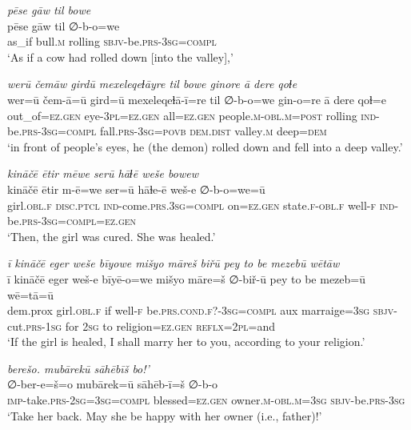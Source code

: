 \ea \label{ZP.79}
\textit{pēse gāw til bowe} \\ 
\gll pēse gāw til ∅-b-o=we \\ 
 as\_if bull\textsc{.m} rolling \textsc{sbjv-}be\textsc{.prs}\textsc{-3sg}\textsc{=compl} \\ 
\glt `As if a cow had rolled down [into the valley],'
\z 
 
\ea \label{ZP.80}
\textit{werū čemāw girdū mexeleqeɫāyre til bowe ginore ā dere qoɫe} \\ 
\gll wer=ū čem-ā=ū gird=ū mexeleqeɫā-ī=re til ∅-b-o=we gin-o=re ā dere qoɫ=e \\ 
 out\_of\textsc{\textsc{=ez.gen}} eye\textsc{-3pl}\textsc{\textsc{=ez.gen}} all\textsc{\textsc{=ez.gen}} people\textsc{.m}\textsc{-obl}\textsc{.m}\textsc{=\textsc{post}} rolling \textsc{ind-}be\textsc{.prs}\textsc{-3sg}\textsc{=compl} fall\textsc{.prs}\textsc{-3sg}\textsc{=\textsc{povb}} \textsc{dem.dist} valley\textsc{.m} deep\textsc{=dem} \\ 
\glt `in front of people’s eyes, he (the demon) rolled down and fell into a deep valley.'
\z 
 
\ea \label{ZP.82}
\textit{kināčē ētir mēwe serū hāɫē weše bowew} \\ 
\gll kināčē ētir m-ē=we ser=ū hāɫe-ē weš-e ∅-b-o=we=ū \\ 
 girl\textsc{.obl}\textsc{.f} \textsc{disc.ptcl} \textsc{ind-}come\textsc{.prs}\textsc{.3sg}\textsc{=compl} on\textsc{\textsc{=ez.gen}} state\textsc{.f}\textsc{-obl}\textsc{.f} well\textsc{-f} \textsc{ind-}be\textsc{.prs}\textsc{-3sg}\textsc{=compl}\textsc{\textsc{=ez.gen}} \\ 
\glt `Then, the girl was cured. She was healed.'
\z 
 
\ea \label{ZP.100}
\textit{ī kināčē eger weše bīyowe mišyo māreš biřū pey to be mezebū wētāw} \\ 
\gll ī kināčē eger weš-e bīyē-o=we mišyo māre=š ∅-biř-ū pey to be mezeb=ū wē=tā=ū \\ 
 dem.prox girl\textsc{.obl}\textsc{.f} if well\textsc{-f} be\textsc{.prs}.\textsc{cond}\textsc{.f}?\textsc{-3sg}\textsc{=compl} aux marraige\textsc{=3sg} \textsc{sbjv-}cut\textsc{.prs}\textsc{-\textsc{1sg}} for \textsc{2sg} to religion\textsc{\textsc{=ez.gen}} \textsc{reflx}=\textsc{2pl}=and \\ 
\glt `If the girl is healed, I shall marry her to you, according to your religion.'
\z 
 
\ea \label{ZP.106}
\textit{berešo. mubārekū sāhēbīš bo!’} \\ 
\gll ∅-ber-e=š=o mubārek=ū sāhēb-ī=š ∅-b-o \\ 
 \textsc{imp-}take\textsc{.prs}-\textsc{2sg}\textsc{=3sg}\textsc{=compl} blessed\textsc{\textsc{=ez.gen}} owner\textsc{.m}\textsc{-obl}\textsc{.m}\textsc{=3sg} \textsc{sbjv-}be\textsc{.prs}\textsc{-3sg} \\ 
\glt `Take her back. May she be happy with her owner (i.e., father)!'
\z 
 
